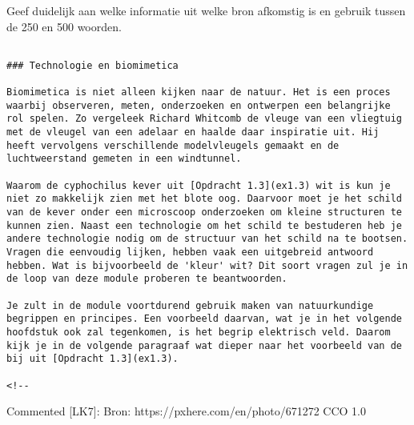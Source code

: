 Geef duidelijk aan welke informatie uit welke bron afkomstig is en
gebruik tussen de 250 en 500 woorden.

\begin{verbatim}

### Technologie en biomimetica

Biomimetica is niet alleen kijken naar de natuur. Het is een proces waarbij observeren, meten, onderzoeken en ontwerpen een belangrijke rol spelen. Zo vergeleek Richard Whitcomb de vleuge van een vliegtuig met de vleugel van een adelaar en haalde daar inspiratie uit. Hij heeft vervolgens verschillende modelvleugels gemaakt en de luchtweerstand gemeten in een windtunnel.

Waarom de cyphochilus kever uit [Opdracht 1.3](ex1.3) wit is kun je niet zo makkelijk zien met het blote oog. Daarvoor moet je het schild van de kever onder een microscoop onderzoeken om kleine structuren te kunnen zien. Naast een technologie om het schild te bestuderen heb je andere technologie nodig om de structuur van het schild na te bootsen. Vragen die eenvoudig lijken, hebben vaak een uitgebreid antwoord hebben. Wat is bijvoorbeeld de 'kleur' wit? Dit soort vragen zul je in de loop van deze module proberen te beantwoorden.

Je zult in de module voortdurend gebruik maken van natuurkundige begrippen en principes. Een voorbeeld daarvan, wat je in het volgende hoofdstuk ook zal tegenkomen, is het begrip elektrisch veld. Daarom kijk je in de volgende paragraaf wat dieper naar het voorbeeld van de bij uit [Opdracht 1.3](ex1.3).

<!-- 
\end{verbatim}

Commented {[}LK7{]}: Bron: https://pxhere.com/en/photo/671272 CCO 1.0

